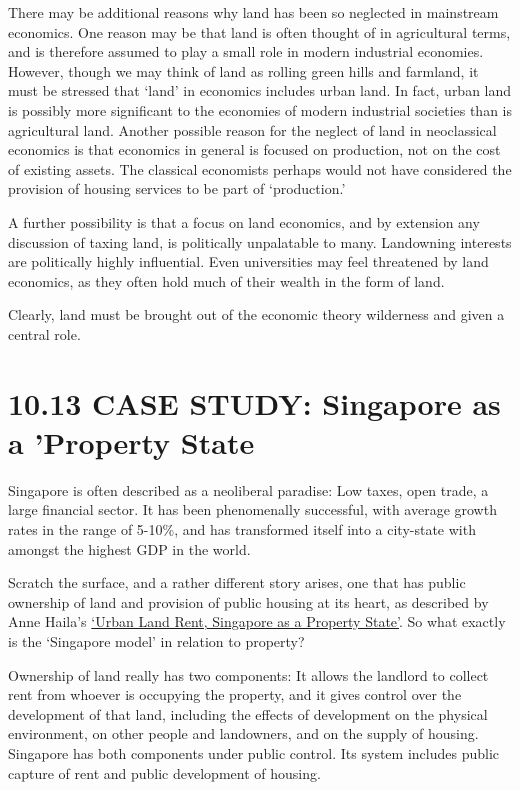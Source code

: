 \documentclass[]{tufte-handout}
\begin{document}
There may be additional reasons why land has been so neglected in
mainstream economics. One reason may be that land is often thought of in
agricultural terms, and is therefore assumed to play a small role in
modern industrial economies. However, though we may think of land as
rolling green hills and farmland, it must be stressed that `land' in
economics includes urban land. In fact, urban land is possibly more
significant to the economies of modern industrial societies than is
agricultural land. Another possible reason for the neglect of land in
neoclassical economics is that economics in general is focused on
production, not on the cost of existing assets. The classical economists
perhaps would not have considered the provision of housing services to
be part of `production.'

A further possibility is that a focus on land economics, and by
extension any discussion of taxing land, is politically unpalatable to
many. Landowning interests are politically highly influential. Even
universities may feel threatened by land economics, as they often hold
much of their wealth in the form of land.

Clearly, land must be brought out of the economic theory wilderness and
given a central role.

\hypertarget{case-study-singapore-as-a-property-state}{%
\section{10.13 CASE STUDY: Singapore as a 'Property
State}\label{case-study-singapore-as-a-property-state}}

Singapore is often described as a neoliberal paradise: Low taxes, open
trade, a large financial sector. It has been phenomenally successful,
with average growth rates in the range of 5-10\%, and has transformed
itself into a city-state with amongst the highest GDP in the world.

Scratch the surface, and a rather different story arises, one that has
public ownership of land and provision of public housing at its heart,
as described by Anne Haila's
\href{https://onlinelibrary.wiley.com/doi/book/10.1002/9781118827611}{`Urban
Land Rent, Singapore as a Property State'}. So what exactly is the
`Singapore model' in relation to property?

Ownership of land really has two components: It allows the landlord to
collect rent from whoever is occupying the property, and it gives
control over the development of that land, including the effects of
development on the physical environment, on other people and landowners,
and on the supply of housing. Singapore has both components under public
control. Its system includes public capture of rent and public
development of housing.
\end{document}
